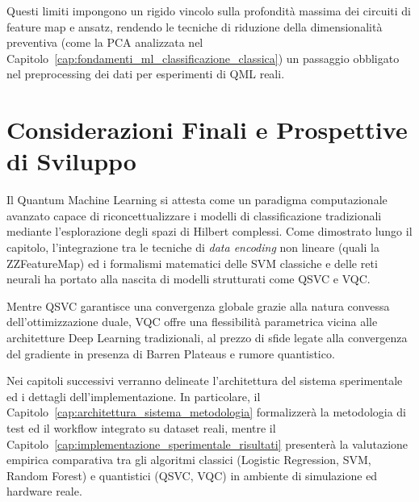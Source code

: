 Questi limiti impongono un rigido vincolo sulla profondità massima dei circuiti di feature map e ansatz, rendendo le tecniche di riduzione della dimensionalità preventiva (come la PCA analizzata nel Capitolo~\ref{cap:fondamenti_ml_classificazione_classica}) un passaggio obbligato nel preprocessing dei dati per esperimenti di QML reali.

\section{Considerazioni Finali e Prospettive di Sviluppo}

Il Quantum Machine Learning si attesta come un paradigma computazionale avanzato capace di riconcettualizzare i modelli di classificazione tradizionali mediante l'esplorazione degli spazi di Hilbert complessi. Come dimostrato lungo il capitolo, l'integrazione tra le tecniche di \textit{data encoding} non lineare (quali la ZZFeatureMap) ed i formalismi matematici delle SVM classiche e delle reti neurali ha portato alla nascita di modelli strutturati come QSVC e VQC.

Mentre QSVC garantisce una convergenza globale grazie alla natura convessa dell'ottimizzazione duale, VQC offre una flessibilità parametrica vicina alle architetture Deep Learning tradizionali, al prezzo di sfide legate alla convergenza del gradiente in presenza di Barren Plateaus e rumore quantistico.

Nei capitoli successivi verranno delineate l'architettura del sistema sperimentale ed i dettagli dell'implementazione. In particolare, il Capitolo~\ref{cap:architettura_sistema_metodologia} formalizzerà la metodologia di test ed il workflow integrato su dataset reali, mentre il Capitolo~\ref{cap:implementazione_sperimentale_risultati} presenterà la valutazione empirica comparativa tra gli algoritmi classici (Logistic Regression, SVM, Random Forest) e quantistici (QSVC, VQC) in ambiente di simulazione ed hardware reale.

